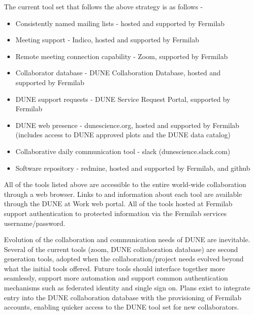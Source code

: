 The current tool set that follows the above strategy is as follows -
\begin{itemize}
\item Consistently named mailing lists - hosted and supported by Fermilab
\item Meeting support - Indico, hosted and supported by Fermilab
\item Remote meeting connection capability - Zoom, supported by Fermilab
\item Collaborator database - DUNE Collaboration Database, hosted and supported by Fermilab
\item DUNE support requests - DUNE Service Request Portal, supported by Fermilab
\item DUNE web presence - dunescience.org, hosted and supported by Fermilab (includes access to DUNE approved plots and the DUNE data catalog)
\item Collaborative daily communication tool - slack (dunescience.slack.com)
\item Software repository - redmine, hosted and supported by Fermilab, and github
\end{itemize}

All of the tools listed above are accessible to the entire world-wide collaboration through a web browser. Links to and information about each tool are available through the DUNE at Work web portal. All of the tools hosted at Fermilab support authentication to protected information via the Fermilab services username/password.

Evolution of the collaboration and communication needs of DUNE are inevitable. Several of the current tools (zoom, DUNE collaboration database) are second generation tools, adopted when the collaboration/project needs evolved beyond what the initial tools offered. Future tools should interface together more seamlessly, support more automation and support common authentication mechanisms such as federated identity and single sign on. Plans exist to integrate entry into the DUNE collaboration database with the provisioning of Fermilab accounts, enabling quicker access to the DUNE tool set for new collaborators.

